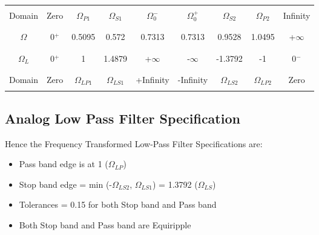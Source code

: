 \documentclass[12pt]{article}
\begin{document}
\begin{center}
	\begin{tabular}{ |c|c|c|c|c|c|c|c|c| }
		\hline
		&&&&&&&&\\
		Domain & Zero & $\Omega_{P1}$ & $\Omega_{S1}$ &$\Omega_0^-$ &$\Omega_0^+$ & $\Omega_{S2}$& $\Omega_{P2}$ & Infinity\\
		&&&&&&&&\\
		\hline
		&&&&&&&&\\
		$\Omega$ & 0$^+$ & 0.5095 & 0.572 &0.7313 &0.7313&0.9528& 1.0495 & +$\infty$\\
		&&&&&&&&\\
		\hline
		&&&&&&&&\\
		$\Omega_L$ & 0$^+$ & 1 & 1.4879 & +$\infty$ & -$\infty$ & -1.3792 & -1 & 0$^-$\\
		&&&&&&&&\\
		\hline
		&&&&&&&&\\
		Domain& Zero & $\Omega_{LP1}$ & $\Omega_{LS1}$ &+Infinity &-Infinity & $\Omega_{LS2}$& $\Omega_{LP2}$ &Zero\\
		&&&&&&&&\\
		\hline
	\end{tabular}
\end{center}

\color{cyan}
\subsection{Analog Low Pass Filter Specification}
\color{black}
Hence the Frequency Transformed Low-Pass Filter Specifications are:
\begin{itemize}
	\item Pass band edge is at 1 ($\Omega_{LP}$)
	\item Stop band edge = min (-$\Omega_{LS2}$, $\Omega_{LS1}$) = 1.3792 ($\Omega_{LS}$)
	\item Tolerances = 0.15 for both Stop band and Pass band
	\item Both Stop band and Pass band are Equiripple
\end{itemize}


\color{cyan}
\end{document}
